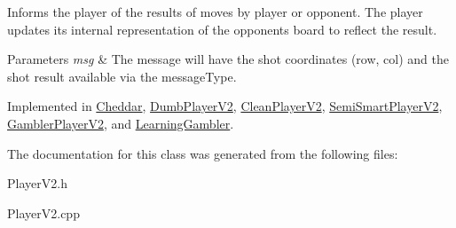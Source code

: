 Informs the player of the results of move\textquotesingle{}s by player or opponent. The player updates its internal representation of the opponent\textquotesingle{}s board to reflect the result. 


\begin{DoxyParams}{Parameters}
{\em msg} & The message will have the shot coordinates (row, col) and the shot result available via the message\+Type. \\
\hline
\end{DoxyParams}


Implemented in \hyperlink{classCheddar_a2cf8926ec6b1faf842eacfe579c8d080}{Cheddar}, \hyperlink{classDumbPlayerV2_a9e91bb555844a7a1ec60edfffcb1be76}{Dumb\+Player\+V2}, \hyperlink{classCleanPlayerV2_ae3c61b1d882a6edb22446cb64e00560f}{Clean\+Player\+V2}, \hyperlink{classSemiSmartPlayerV2_a000b503d95d671bb819645b61e7fbc84}{Semi\+Smart\+Player\+V2}, \hyperlink{classGamblerPlayerV2_a2d46df35dd7fc5ded8502040b15f9209}{Gambler\+Player\+V2}, and \hyperlink{classLearningGambler_a40f003de6770045d83167434ffd4d407}{Learning\+Gambler}.



The documentation for this class was generated from the following files\+:\begin{DoxyCompactItemize}
\item 
Player\+V2.\+h\item 
Player\+V2.\+cpp\end{DoxyCompactItemize}
